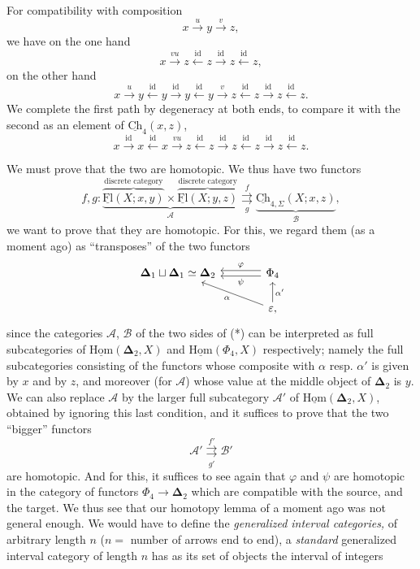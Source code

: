 \documentclass[11pt]{article}
\newcommand{\printedpage}[1]{\marginpar{\footnotesize p.~#1}}
\newcommand{\msp}[1]{\marginpar{\footnotesize [#1]}}
\newcommand{\uCh}{\underline{\mathrm{Ch}}}
\newcommand{\uHom}{\underline{\mathrm{Hom}}}
\newcommand{\uFl}{\underline{\mathrm{Fl}}}
\newcommand{\bDelta}{\boldsymbol{\Delta}}
\begin{document}
For compatibility with composition
\[
x \xrightarrow{u} y \xrightarrow{v} z,
\]
we have on the one hand
\[
x \xrightarrow{vu} z \xleftarrow{\mathrm{id}} z \xrightarrow{\mathrm{id}} z \xleftarrow{\mathrm{id}} z,
\]
on the other hand
\[
x \xrightarrow{u} y \xleftarrow{\mathrm{id}} y \xrightarrow{\mathrm{id}} y \xleftarrow{\mathrm{id}} y \xrightarrow{v} z \xleftarrow{\mathrm{id}} z \xrightarrow{\mathrm{id}} z \xleftarrow{\mathrm{id}} z.
\]
We complete the first path by degeneracy at both ends, to compare it with the second as an element of $\uCh_4(x,z)$,
\[
x \xrightarrow{\mathrm{id}} x \xleftarrow{\mathrm{id}} x \xrightarrow{vu} z \xleftarrow{\mathrm{id}} z \xrightarrow{\mathrm{id}} z \xleftarrow{\mathrm{id}} z \xrightarrow{\mathrm{id}} z \xleftarrow{\mathrm{id}} z.
\]

\msp{page 24}We must prove that the two are homotopic. We thus have two functors
\[
f,g : \underbrace{\overbrace{\uFl(X;x,y)}^{\text{discrete category}} \times \overbrace{\uFl(X;y,z)}^{\text{discrete category}}}_{\mathcal{A}} \underset{g}{\overset{f}{\rightrightarrows}} \underbrace{\uCh_{4,\Sigma}(X;x,z)}_{\mathcal{B}}, \tag*{$(\ast)$}
\]
we want to prove that they are homotopic. For this, we regard them (as a moment ago) as ``transposes'' of the two functors
\[
\begin{tikzcd}[column sep=large]
\bDelta_1 \sqcup \bDelta_1 \simeq \bDelta_2 & \Phi_4 \arrow[l, shift right, "\varphi"'] \arrow[l, shift left, "\psi"] \\
& \varepsilon, \arrow[ul, "\alpha"] \arrow[u, "\alpha'"']
\end{tikzcd}
\]
since the categories $\mathcal{A}$, $\mathcal{B}$ of the two sides of (*) can be interpreted as full subcategories of $\uHom(\bDelta_2, X)$ and $\uHom(\Phi_4, X)$ respectively; namely the full subcategories consisting of the functors whose composite with $\alpha$ resp. $\alpha'$ is given by $x$ and by $z$, and moreover (for $\mathcal{A}$) whose value at the middle object of $\bDelta_2$ is $y$. We can also replace $\mathcal{A}$ by the larger full subcategory $\mathcal{A}'$ of $\uHom(\bDelta_2, X)$, obtained by ignoring this last condition, and it suffices to prove that the two ``bigger'' functors
\printedpage{16}
\[
\mathcal{A}' \underset{g'}{\overset{f'}{\rightrightarrows}} \mathcal{B}'
\]
are homotopic. And for this, it suffices to
\msp{page 25}see again that $\varphi$ and $\psi$ are homotopic in the category of functors $\Phi_4 \longrightarrow \bDelta_2$ which are compatible with the source, and the target. We thus see that our homotopy lemma of a moment ago was not general enough. We would have to define the \textit{generalized interval categories,} of arbitrary length $n$ ($n =$ number of arrows end to end), a \textit{standard} generalized interval category of length $n$ has as its set of objects the interval of integers %
\end{document}
